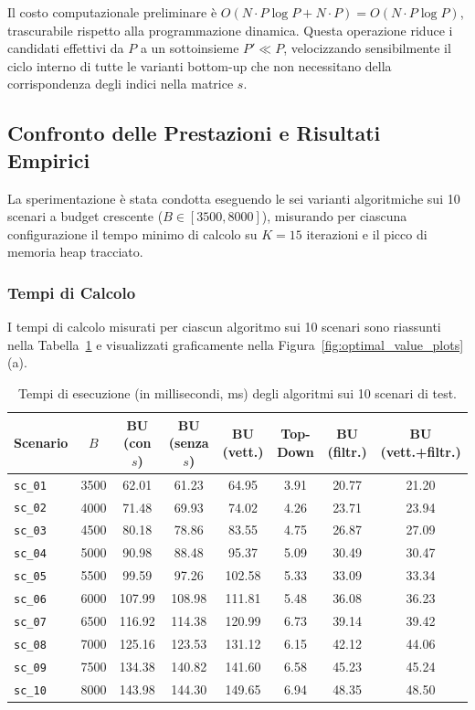 Il costo computazionale preliminare è $O(N \cdot P \log P + N \cdot P) = O(N \cdot P \log P)$, trascurabile rispetto alla programmazione dinamica. Questa operazione riduce i candidati effettivi da $P$ a un sottoinsieme $P' \ll P$, velocizzando sensibilmente il ciclo interno di tutte le varianti bottom-up che non necessitano della corrispondenza degli indici nella matrice $s$.

\subsection{Confronto delle Prestazioni e Risultati Empirici}
La sperimentazione è stata condotta eseguendo le sei varianti algoritmiche sui 10 scenari a budget crescente ($B \in [3500, 8000]$), misurando per ciascuna configurazione il tempo minimo di calcolo su $K = 15$ iterazioni e il picco di memoria heap tracciato.

\subsubsection{Tempi di Calcolo}
I tempi di calcolo misurati per ciascun algoritmo sui 10 scenari sono riassunti nella Tabella~\ref{tab:execution_times} e visualizzati graficamente nella Figura~\ref{fig:optimal_value_plots}(a).

\begin{table}[!htbp]
	\centering
	\footnotesize
	\setlength{\tabcolsep}{4.5pt}
	\caption{Tempi di esecuzione (in millisecondi, ms) degli algoritmi sui 10 scenari di test.}
	\label{tab:execution_times}
	\begin{tabular}{lccccccc}
		\toprule
		\textbf{Scenario} & $B$ & \textbf{BU (con $s$)} & \textbf{BU (senza $s$)} & \textbf{BU (vett.)} & \textbf{Top-Down} & \textbf{BU (filtr.)} & \textbf{BU (vett.+filtr.)} \\
		\midrule
		\texttt{sc\_01} & 3500 & 62.01 & 61.23 & 64.95 & 3.91 & 20.77 & 21.20 \\
		\texttt{sc\_02} & 4000 & 71.48 & 69.93 & 74.02 & 4.26 & 23.71 & 23.94 \\
		\texttt{sc\_03} & 4500 & 80.18 & 78.86 & 83.55 & 4.75 & 26.87 & 27.09 \\
		\texttt{sc\_04} & 5000 & 90.98 & 88.48 & 95.37 & 5.09 & 30.49 & 30.47 \\
		\texttt{sc\_05} & 5500 & 99.59 & 97.26 & 102.58 & 5.33 & 33.09 & 33.34 \\
		\texttt{sc\_06} & 6000 & 107.99 & 108.98 & 111.81 & 5.48 & 36.08 & 36.23 \\
		\texttt{sc\_07} & 6500 & 116.92 & 114.38 & 120.99 & 6.73 & 39.14 & 39.42 \\
		\texttt{sc\_08} & 7000 & 125.16 & 123.53 & 131.12 & 6.15 & 42.12 & 44.06 \\
		\texttt{sc\_09} & 7500 & 134.38 & 140.82 & 141.60 & 6.58 & 45.23 & 45.24 \\
		\texttt{sc\_10} & 8000 & 143.98 & 144.30 & 149.65 & 6.94 & 48.35 & 48.50 \\
		\bottomrule
	\end{tabular}
\end{table}

